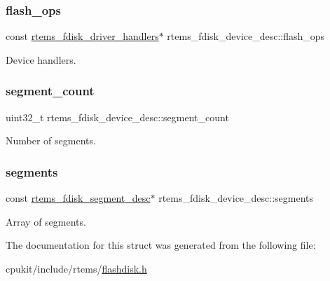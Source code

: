 \subsubsection{\texorpdfstring{flash\_ops}{flash\_ops}}
{\footnotesize\ttfamily const \mbox{\hyperlink{structrtems__fdisk__driver__handlers}{rtems\+\_\+fdisk\+\_\+driver\+\_\+handlers}}$\ast$ rtems\+\_\+fdisk\+\_\+device\+\_\+desc\+::flash\+\_\+ops}

Device handlers. \mbox{\label{structrtems__fdisk__device__desc_a506d1a44cd7009b8256e12fcc02e2306}} 
\subsubsection{\texorpdfstring{segment\_count}{segment\_count}}
{\footnotesize\ttfamily uint32\+\_\+t rtems\+\_\+fdisk\+\_\+device\+\_\+desc\+::segment\+\_\+count}

Number of segments. \mbox{\label{structrtems__fdisk__device__desc_a34e346516450cb073e0cddadcbbfdd8a}} 
\subsubsection{\texorpdfstring{segments}{segments}}
{\footnotesize\ttfamily const \mbox{\hyperlink{structrtems__fdisk__segment__desc}{rtems\+\_\+fdisk\+\_\+segment\+\_\+desc}}$\ast$ rtems\+\_\+fdisk\+\_\+device\+\_\+desc\+::segments}

Array of segments. 

The documentation for this struct was generated from the following file\+:\begin{DoxyCompactItemize}
\item 
cpukit/include/rtems/\mbox{\hyperlink{flashdisk_8h}{flashdisk.\+h}}\end{DoxyCompactItemize}
